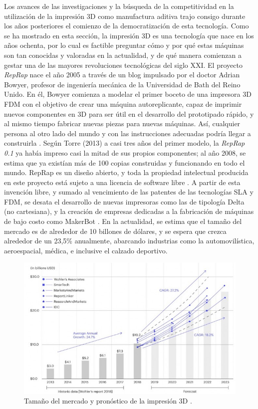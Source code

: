 Los avances de las investigaciones y la búsqueda de la competitividad en la utilización de la impresión 3D como  manufactura aditiva trajo consigo durante los años posteriores el comienzo de la democratización de esta tecnología. Como se ha mostrado en esta sección, la impresión 3D es una tecnología que nace en los años ochenta, por lo cual es factible preguntar cómo y por qué estas máquinas son tan conocidas y valoradas en la actualidad, y de qué manera comienzan a gestar una de las mayores revoluciones tecnológicas del siglo XXI. El proyecto \textit{RepRap} nace el año 2005 a través de un blog impulsado por el doctor Adrian Bowyer, profesor de ingeniería mecánica de la Universidad de Bath del Reino Unido. En él, Bowyer comienza a modelar el primer boceto de una impresora 3D FDM con el objetivo de crear una máquina autoreplicante, capaz de imprimir nuevos componentes en 3D para ser útil en el desarrollo del prototipado rápido, y al mismo tiempo fabricar nuevas piezas para nuevas máquinas. Así, cualquier persona al otro lado del mundo y con las instrucciones adecuadas podría llegar a construirla  \citep{torre2013}. Según Torre (2013) a casi tres años del primer modelo, la \textit{RepRap 0.1} ya había impreso casi la mitad de sus propios componentes; al año 2008, se estima que ya existían más de 100 copias construidas y funcionando en todo el mundo. RepRap es un diseño abierto, y toda la propiedad intelectual producida en este proyecto está sujeto a una licencia de software libre \citep{alltresdp2016}. A partir de esta invención libre, y sumado al vencimiento de las patentes de las tecnologías SLA y FDM, se desata el desarrollo de nuevas impresoras como las de tipología Delta (no cartesiana), y la creación de empresas dedicadas a la fabricación de máquinas de bajo costo como MakerBot \citep{tresdsourced2020}. En la actualidad, se estima que el tamaño del mercado es de alrededor de 10 billones de dólares, y se espera que crezca alrededor de un 23,5\% anualmente, abarcando industrias como la automovilística, aeroespacial, médica, e inclusive el calzado deportivo\citep{donovan2019}.

\begin{figure}[H]
\centering
\includegraphics[scale=0.8]{images/3dmarket.png}
\caption{Tamaño del mercado y pronóstico de la impresión 3D \citep{donovan2019}.}

\end{figure}

